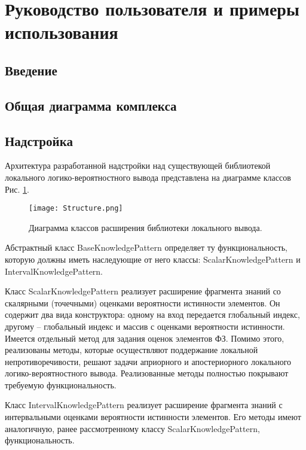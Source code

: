 \section{Руководство пользователя и примеры использования}
\subsection{Введение}


\subsection{Общая диаграмма комплекса}
    
    
\subsection{Надстройка}
Архитектура разработанной надстройки над существующей библиотекой локального логико-вероятностного вывода представлена на диаграмме классов Рис. \ref{Structure}.

\begin{figure}[h!]
\begin{center}
\texttt{[image: Structure.png]}
\caption{Диаграмма классов расширения библиотеки локального вывода.}
\label{Structure}
\end{center}
\end{figure}

Абстрактный класс BaseKnowledgePattern определяет ту функциональность, которую должны иметь наследующие от него классы: Scalar\-KnowledgePattern и IntervalKnowledgePattern.

Класс ScalarKnowledgePattern реализует расширение фрагмента знаний со скалярными (точечными) оценками вероятности истинности элементов. Он содержит два вида конструктора: одному на вход передается глобальный индекс, другому -- глобальный индекс и массив с оценками вероятности истинности. Имеется отдельный метод для задания оценок элементов ФЗ. Помимо этого, реализованы методы, которые осуществляют поддержание локальной непротиворечивости, решают задачи априорного и апостериорного локального логико-вероятностного вывода. Реализованные методы полностью покрывают требуемую функциональность.

Класс IntervalKnowledgePattern реализует расширение фрагмента знаний с интервальными оценками вероятности истинности элементов. Его методы имеют аналогичную, ранее рассмотренному классу Scalar\-KnowledgePattern, функциональность.


